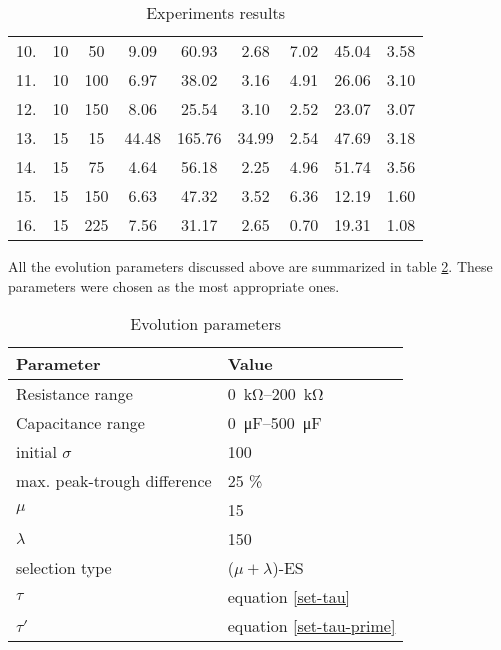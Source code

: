 \begin{table}[H]
\begin{tabular}{@{}ccccccccc@{}}
10. & 10    & 50        & 9.09       & 60.93     & 2.68             & 7.02       & 45.04      & 3.58           \\
11. & 10    & 100       & 6.97       & 38.02     & 3.16             & 4.91       & 26.06      & 3.10           \\
12. & 10    & 150       & 8.06       & 25.54     & 3.10             & 2.52       & 23.07      & 3.07           \\
13. & 15    & 15        & 44.48      & 165.76    & 34.99            & 2.54       & 47.69      & 3.18           \\
14. & 15    & 75        & 4.64       & 56.18     & 2.25             & 4.96       & 51.74      & 3.56           \\
15. & 15    & 150       & 6.63       & 47.32     & 3.52             & 6.36       & 12.19      & 1.60           \\
16. & 15    & 225       & 7.56       & 31.17     & 2.65             & 0.70       & 19.31      & 1.08           \\
    \bottomrule
\end{tabular}
\caption{Experiments results}
\label{experiments-results}
\end{table}


All the evolution parameters discussed above are summarized in table \ref{evolution-parameters}. These parameters were chosen as the most appropriate ones.

\begin{table}[H]
\centering
\begin{tabular}{@{}ll@{}}
\toprule
    Parameter                   & Value \\ \midrule
    Resistance range            & \SIrange{0}{200}{\kilo\ohm} \\
    Capacitance range           & \SIrange{0}{500}{\micro\farad} \\
    initial $\sigma$            & 100 \\
    max. peak-trough difference & 25 \% \\
    $\mu$                       & 15 \\
    $\lambda$                   & 150 \\
    selection type              & ($\mu + \lambda$)-ES \\
    $\tau$                      & equation \ref{set-tau}\\
    $\tau'$                     & equation \ref{set-tau-prime} \\ \bottomrule
\end{tabular}
\caption{Evolution parameters}
\label{evolution-parameters}
\end{table}

